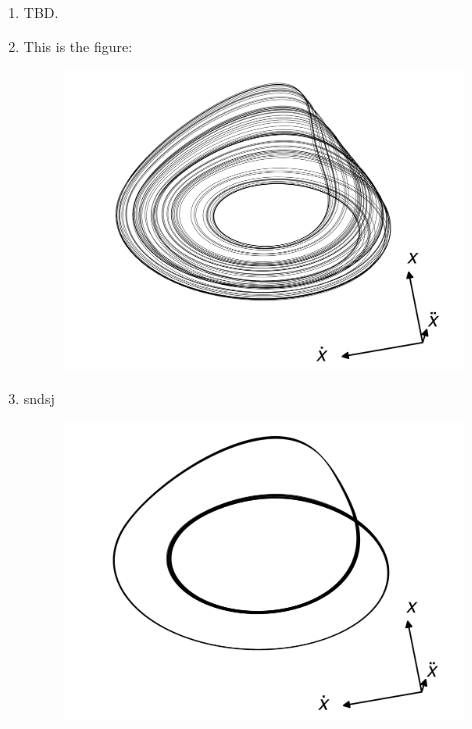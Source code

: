 \begin{enumerate}
    \item TBD.
    \item This is the figure:
    \begin{figure}[!ht]
        \centering
        \includegraphics[scale=0.12]{images/6b.png}
        \label{fig:6b}
    \end{figure}
    \item sndsj
    \begin{figure}[!ht]
        \centering
        \includegraphics[scale=0.12]{images/6c.png}
        \label{fig:6c}
    \end{figure}
\end{enumerate}

